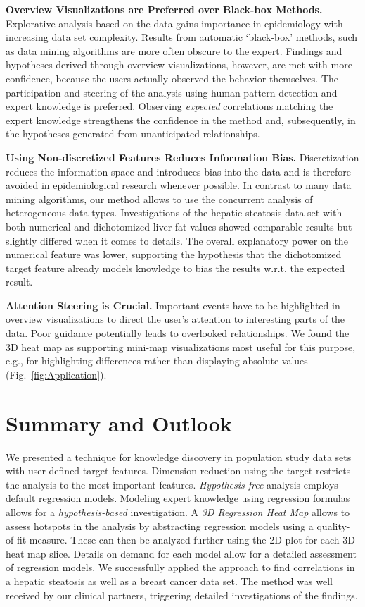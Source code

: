 \documentclass[journal]{style/vgtc} 			          %
\begin{document}
\textbf{Overview Visualizations are Preferred over Black-box Methods.}
Explorative analysis based on the data gains importance in epidemiology with increasing data set complexity.
Results from automatic `black-box' methods, such as data mining algorithms are more often obscure to the expert.
Findings and hypotheses derived through overview visualizations, however, are met with more confidence, because the users actually observed the behavior themselves.
The participation and steering of the analysis using human pattern detection and expert knowledge is preferred.
Observing \emph{expected} correlations matching the expert knowledge strengthens the confidence in the method and, subsequently, in the hypotheses generated from unanticipated relationships.

\textbf{Using Non-discretized Features Reduces Information Bias.}
Discretization reduces the information space and introduces bias into the data and is therefore avoided in epidemiological research whenever possible.
In contrast to many data mining algorithms, our method allows to use the concurrent analysis of heterogeneous data types.
Investigations of the hepatic steatosis data set with both numerical and dichotomized liver fat values showed comparable results but slightly differed when it comes to details.
The overall explanatory power on the numerical feature was lower, supporting the hypothesis that the dichotomized target feature already models knowledge to bias the results w.r.t. the expected result.

\textbf{Attention Steering is Crucial.}
Important events have to be highlighted in overview visualizations to direct the user's attention to interesting parts of the data.
Poor guidance potentially leads to overlooked relationships.
We found the 3D heat map as supporting mini-map visualizations most useful for this purpose, e.g., for highlighting differences rather than displaying absolute values (Fig.~\ref{fig:Application}).
\section{Summary and Outlook}
We presented a technique for knowledge discovery in population study data sets with user-defined target features.
Dimension reduction using the target restricts the analysis to the most important features.
\emph{Hypothesis-free} analysis employs default regression models.
Modeling expert knowledge using regression formulas allows for a \emph{hypothesis-based} investigation.
A \emph{3D Regression Heat Map} allows to assess hotspots in the analysis by abstracting regression models using a quality-of-fit measure.
These can then be analyzed further using the 2D plot for each 3D heat map slice.
Details on demand for each model allow for a detailed assessment of regression models.
We successfully applied the approach to find correlations in a hepatic steatosis as well as a breast cancer data set.
The method was well received by our clinical partners, triggering detailed investigations of the findings.
\end{document}
